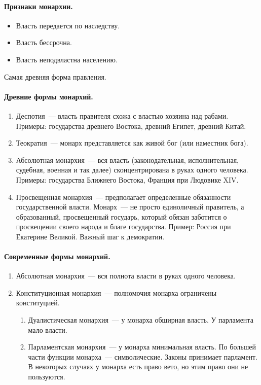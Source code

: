 \documentclass[12pt]{article}
\begin{document}
	\paragraph{Признаки монархии.}
	\begin{itemize}
		\item Власть передается по наследству.
		\item Власть бессрочна.
		\item Власть неподвластна населению.
	\end{itemize}
	\begin{note}
		Самая древняя форма правления.
	\end{note}
	\paragraph{Древние формы монархий.}
	\begin{enumerate}
		\item Деспотия~--- власть правителя схожа с властью хозяина над рабами. Примеры: государства древнего Востока, древний Египет, древний Китай.
		\item Теократия~--- монарх представляется как живой бог (или наместник бога).
		\item Абсолютная монархия~--- вся власть (законодательная, исполнительная, судебная, военная и так далее) сконцентрирована в руках одного человека. Примеры: государства Ближнего Востока, Франция при Людовике XIV.
		\item Просвещенная монархия~--- предполагает определенные обязанности государственной власти. Монарх~--- не просто единоличный правитель, а образованный, просвещенный государь, который обязан заботится о просвещении своего народа и благе государства. Пример: Россия при Екатерине Великой. Важный шаг к демократии.
	\end{enumerate}
	\paragraph{Современные формы монархий.}
	\begin{enumerate}
		\item Абсолютная монархия~--- вся полнота власти в руках одного человека.
		\item Конституционная монархия~--- полномочия монарха ограничены конституцией.
		\begin{enumerate}
			\item Дуалистическая монархия~--- у монарха обширная власть. У парламента мало власти.
			\item Парламентская монархия~--- у монарха минимальная власть. По большей части функции монарха~--- символические. Законы принимает парламент. В некоторых случаях у монарха есть право вето, но этим право они не пользуются.
		\end{enumerate}
	\end{enumerate}
\end{document}
